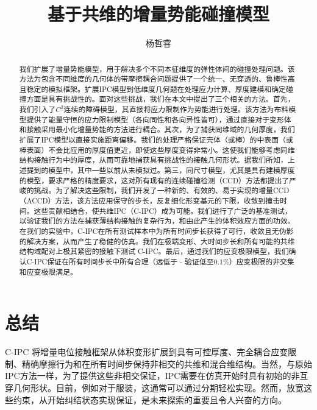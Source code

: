 \documentclass[lang=cn]{ctexart}
\title{基于共维的增量势能碰撞模型}
\author{杨哲睿}
\begin{document}
\maketitle

\begin{abstract}
  我们扩展了增量势能模型，用于解决多个不同本征维度的弹性体间的碰撞处理问题。该方法为包含不同维度的几何体的带摩擦耦合问题提供了一个统一、无穿透的、鲁棒性高且稳定的模拟框架。扩展IPC模型到低维度几何题在处理应力计算、厚度建模和确定碰撞方面是具有挑战性的。面对这些挑战，我们在本文中提出了三个相关的方法。首先，我们引入了$C^2$连续的障碍模型，其直接将应力限制作为势能进行处理。该方法为布料模型提供了能量守恒的应力限制模型（各向同性和各向异性皆可），通过直接对于变形体和接触采用最小化增量势能的方法进行耦合。其次，为了捕获同维域的几何厚度，我们扩展了IPC模型以直接实施距离偏移。我们的处理严格保证壳体（或棒）的中表面（或棒表面）不会比应用的厚度值更近，即使这些厚度变得非常小。这使我们能够考虑同维结构接触行为中的厚度，从而可靠地捕获具有挑战性的接触几何形状。据我们所知，上述提到的模型中，其中一些以前从未模拟过。第三，同尺寸模型，尤其是具有建模厚度的模型，要求严格的精度要求，这对所有现有的连续碰撞检测（CCD）方法都提出了严峻的挑战。为了解决这些限制，我们开发了一种新的、有效的、易于实现的增量CCD（ACCD）方法，该方法应用保守的步长，反复细化形变基元的下限，收敛到撞击时间。这些贡献相结合，使共维IPC（C-IPC）成为可能。我们进行了广泛的基准测试，以验证我们的方法在捕获薄结构接触的复杂行为，和由此产生的体积效应方面的功效。在我们的实验中，C-IPC在所有测试样本中为所有时间步长获得了可行，收敛且无伪影的解决方案，从而产生了稳健的仿真。我们在极端变形、大时间步长和所有可能的共维结构域配对上极其紧密的接触下测试 C-IPC。最后，通过我们的应变极限模型，我们确认C-IPC保证在所有时间步长中所有合理（远低于 - 验证低至0.1\%）应变极限的非交集和应变极限满足。
\end{abstract}

\tableofcontents








\section{总结}
C-IPC 将增量电位接触框架从体积变形扩展到具有可控厚度、完全耦合应变限制、精确摩擦行为和在所有时间步保持非相交的共维和混合维结构。当然，与原始IPC方法一样，为了提供这些非相交保证，IPC需要在仿真开始时具有初始的非互穿几何形状。目前，例如对于服装，这通常可以通过分期轻松实现。然而，放宽这些约束，从开始纠结状态实现保证，是未来探索的重要且令人兴奋的方向。
\end{document}
